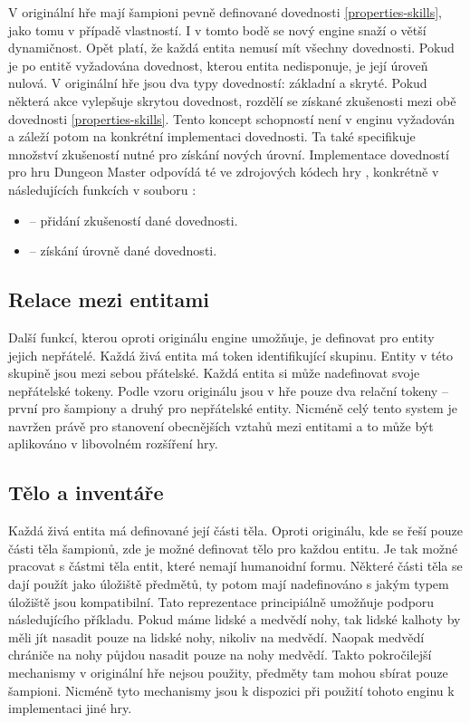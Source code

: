 V originální hře mají šampioni pevně definované dovednosti \vref{properties-skills}, jako tomu v případě vlastností.
I v tomto bodě se nový engine snaží o větší dynamičnost. Opět platí, že každá entita nemusí mít všechny dovednosti.
Pokud je po entitě vyžadována dovednost, kterou entita nedisponuje, je její úroveň nulová.
V originální hře jsou dva typy dovedností: základní a skryté. Pokud některá akce vylepšuje skrytou dovednost,
rozdělí se získané zkušenosti mezi obě dovednosti \vref{properties-skills}. Tento koncept schopností není v enginu vyžadován a 
záleží potom na konkrétní implementaci dovednosti. Ta také specifikuje množství zkušeností nutné pro 
získání nových úrovní. Implementace dovedností pro hru Dungeon Master odpovídá té ve zdrojových kódech hry \cite{DMDecompilation},
konkrétně v následujících funkcích  v souboru :

\begin{itemize}
\item {} -- přidání zkušeností dané dovednosti.
\item {} -- získání úrovně dané dovednosti.
\end{itemize}

\subsection{Relace mezi entitami}
Další funkcí, kterou oproti originálu engine umožňuje, je definovat pro entity jejich nepřátelé. Každá živá entita má token identifikující
skupinu. Entity v této skupině jsou mezi sebou přátelské. Každá entita si může nadefinovat svoje nepřátelské tokeny.
Podle vzoru originálu jsou v hře pouze dva relační tokeny -- první pro šampiony a druhý pro nepřátelské entity. Nicméně
celý tento system je navržen právě pro stanovení obecnějších vztahů mezi entitami a to může být aplikováno v libovolném rozšíření hry.
 
\subsection{Tělo a inventáře}
Každá živá entita má definované její části těla. Oproti originálu, kde se řeší pouze části těla šampionů,
zde je možné definovat tělo pro každou entitu. Je tak možné pracovat s částmi těla entit, které nemají humanoidní formu.
Některé části těla se dají použít jako úložiště předmětů, ty potom mají nadefinováno s jakým typem úložiště jsou kompatibilní.
Tato reprezentace principiálně umožňuje podporu následujícího příkladu. Pokud máme lidské a medvědí nohy, tak lidské
kalhoty by měli jít nasadit pouze na lidské nohy, nikoliv na medvědí. Naopak medvědí chrániče na nohy půjdou nasadit pouze na
nohy medvědí. Takto pokročilejší mechanismy v originální hře nejsou použity, předměty tam mohou sbírat pouze šampioni. Nicméně
tyto mechanismy jsou k dispozici při použití tohoto enginu k implementaci jiné hry.

